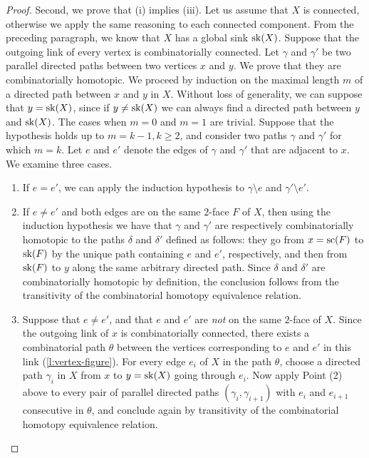 \begin{proof}
   Second, we prove that (i) implies (iii).
    Let us assume that $X$ is connected, otherwise we apply the same reasoning to each connected component. 
    From the preceding paragraph, we know that $X$ has a global sink $\mathrm{sk}(X)$.
    Suppose that the outgoing link of every vertex is combinatorially connected. 
    Let $\gamma$ and $\gamma'$ be two parallel directed paths between two vertices $x$ and $y$. 
    We prove that they are combinatorially homotopic. 
    We proceed by induction on the maximal length $m$ of a directed path between $x$ and $y$ in $X$. 
    Without loss of generality, we can suppose that $y=\mathrm{sk}(X)$, since if $y\neq\mathrm{sk}(X)$ we can always find a directed path between $y$ and $\mathrm{sk}(X)$.
    The cases when $m=0$ and $m=1$ are trivial. 
    Suppose that the hypothesis holds up to $m=k-1, k\geq 2$, and consider two paths $\gamma$ and $\gamma'$ for which $m=k$. 
    Let $e$ and $e'$ denote the edges of $\gamma$ and $\gamma'$ that are adjacent to $x$. 
    We examine three cases.
    \begin{enumerate}
        \item If $e=e'$, we can apply the induction hypothesis to $\gamma \setminus e$ and $\gamma' \setminus e'$. 
        \item If $e \neq e'$ and both edges are on the same $2$-face $F$ of $X$, then using the induction hypothesis we have that $\gamma$ and $\gamma'$ are respectively combinatorially homotopic to the paths $\delta$ and $\delta'$ defined as follows: they go from $x=\mathrm{sc}(F)$ to $\mathrm{sk}(F)$ by the unique path containing $e$ and $e'$, respectively, and then from $\mathrm{sk}(F)$ to $y$ along the same arbitrary directed path. 
        Since $\delta$ and $\delta'$ are combinatorially homotopic by definition, the conclusion follows from the transitivity of the combinatorial homotopy equivalence relation. 
        \item Suppose that $e\neq e'$, and that $e$ and $e'$ are \emph{not} on the same $2$-face of $X$. 
        Since the outgoing link of $x$ is combinatorially connected, there exists a combinatorial path $\theta$ between the vertices corresponding to $e$ and $e'$ in this link (\cref{l:vertex-figure}). 
        For every edge $e_i$ of $X$ in the path $\theta$, choose a directed path $\gamma_i$ in $X$ from $x$ to $y=\mathrm{sk}(X)$ going through $e_i$. 
        Now apply Point (2) above to every pair of parallel directed paths $(\gamma_i, \gamma_{i+1})$ with $e_i$ and $e_{i+1}$ consecutive in $\theta$, and conclude again by transitivity of the combinatorial homotopy equivalence relation. 
    \end{enumerate}


\end{proof}
